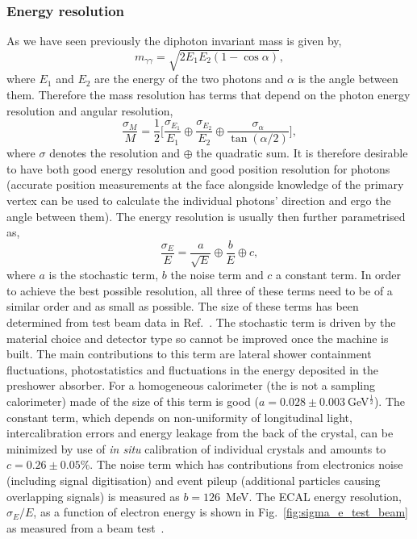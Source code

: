 \subsubsection{Energy resolution}
As we have seen previously the diphoton invariant mass is given by,
\begin{equation}
  m_{\gamma\gamma} = \sqrt{2E_{1}E_{2}(1-\cos\alpha)},
  \label{eq:dipho_inv_mass}
\end{equation}
where $E_{1}$ and $E_{2}$ are the energy of the two photons and $\alpha$ is the angle between them. Therefore the mass resolution has terms that depend on the photon energy resolution and angular resolution,
\begin{equation}
  \frac{\sigma_{M}}{M} = \frac{1}{2} \Biggl[ \frac{\sigma_{E_{1}}}{E_{1}} \oplus \frac{\sigma_{E_{2}}}{E_{2}} \oplus \frac{\sigma_{\alpha}}{\tan(\alpha/2)} \Biggr],
  \label{eq:mass_res}
\end{equation}
where $\sigma$ denotes the resolution and $\oplus$ the quadratic sum. It is therefore desirable to have both good energy resolution and good position resolution for photons (accurate position measurements at the \ECAL face alongside knowledge of the primary vertex can be used to calculate the individual photons' direction and ergo the angle between them). The energy resolution is usually then further parametrised as,
\begin{equation}
  \frac{\sigma_{E}}{E} = \frac{a}{\sqrt{E}} \oplus \frac{b}{E} \oplus c,
  \label{eq:energy_res}
\end{equation}
where $a$ is the stochastic term, $b$ the noise term and $c$ a constant term. In order to achieve the best possible resolution, all three of these terms need to be of a similar order and as small as possible. The size of these terms has been determined from test beam data in Ref.~\cite{CMS_JINST}. The stochastic term is driven by the material choice and detector type so cannot be improved once the machine is built. The main contributions to this term are lateral shower containment fluctuations, photostatistics and fluctuations in the energy deposited in the preshower absorber. For a homogeneous calorimeter (the \CMS \ECAL is not a sampling calorimeter) made of \PbWO the size of this term is good ($a=0.028\pm0.003~$GeV$^{\frac{1}{2}}$). The constant term, which depends on non-uniformity of longitudinal light, intercalibration errors and energy leakage from the back of the crystal, can be minimized by use of \emph{in situ} calibration of individual crystals and amounts to $c=0.26\pm0.05\%$. The noise term which has contributions from electronics noise (including signal digitisation) and event pileup (additional particles causing overlapping signals) is measured as $b=126$~MeV. The ECAL energy resolution, $\sigma_{E}/E$, as a function of electron energy is shown in Fig.~\ref{fig:sigma_e_test_beam} as measured from a beam test~\cite{CMS_JINST}. 

